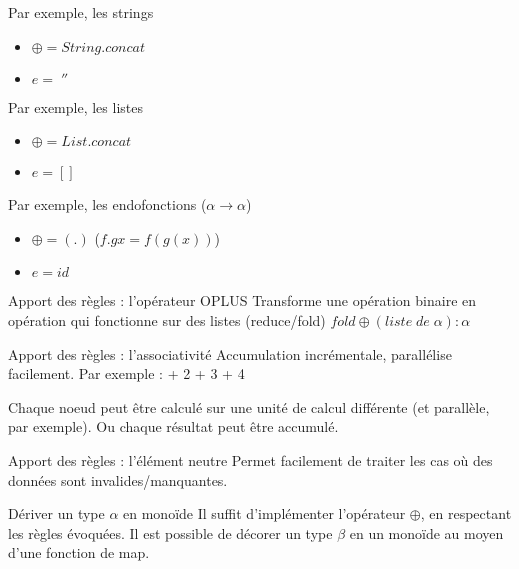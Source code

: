\documentclass{beamer}
\newcommand{\adjustimg}{%
  \checkoddpage%
  \ifoddpage\hspace*{
		\dimexpr\evensidemargin-\oddsidemargin}\else\hspace*{
			-\dimexpr\evensidemargin-\oddsidemargin}\fi%
}
\newcommand{\centerimg}[2][width=\textwidth]{%
  \makebox[\textwidth]{\adjustimg\texttt{[image: \#2]}}%
}
\begin{document}
  \begin{frame}{Par exemple, les strings}
    \begin{itemize}
      \item $\oplus = String.concat$
      \item $e = \; ''$
    \end{itemize}
  \end{frame}

  \begin{frame}{Par exemple, les listes}
    \begin{itemize}
      \item $\oplus = List.concat$
      \item $e = []$
    \end{itemize}
  \end{frame}

  \begin{frame}{Par exemple, les endofonctions ($\alpha \rightarrow \alpha$)}
    \begin{itemize}
      \item $\oplus = (.) $ ($f.g x= f(g(x))$)
      \item $e = id$
    \end{itemize}
  \end{frame}


    \begin{frame}{Apport des règles : l'opérateur OPLUS}
      Transforme une opération binaire en opération qui fonctionne sur des listes (reduce/fold)
      \newline
      \newline
      $fold \oplus (liste \; de \; \alpha) : \alpha$
    \end{frame}


      \begin{frame}{Apport des règles : l'associativité}
        Accumulation incrémentale, parallélise facilement. Par exemple :  + 2 + 3 + 4
        \centerimg[width=100pt, height=80pt]{figures/divide.pdf}
        Chaque noeud peut être calculé sur une unité de calcul différente (et parallèle, par exemple). Ou chaque
        résultat peut être accumulé.
      \end{frame}

      \begin{frame}{Apport des règles : l'élément neutre}
        Permet facilement de traiter les cas où des données sont invalides/manquantes.
      \end{frame}

      \begin{frame}{Dériver un type $\alpha$ en monoïde}
        Il suffit d'implémenter l'opérateur $\oplus$, en respectant les règles évoquées. \newline
        Il est possible de décorer un type $\beta$ en un monoïde au moyen d'une fonction de map.
      \end{frame}
\end{document}

